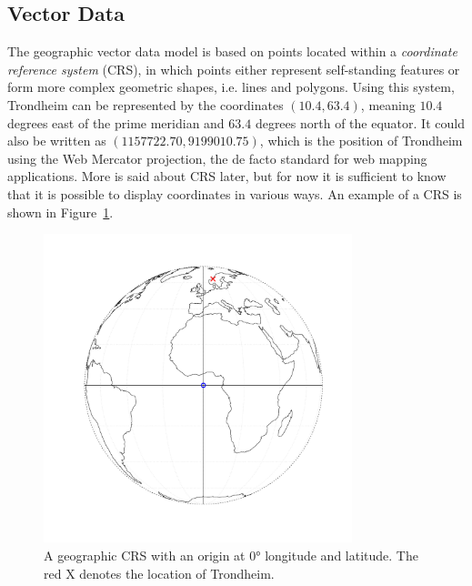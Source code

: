 \subsection{Vector Data}
The geographic vector data model is based on points located within a \textit{coordinate reference system} (CRS), in which points either represent self-standing features or form more complex geometric shapes, i.e. lines and polygons. Using this system, Trondheim can be represented by the coordinates $\left(10.4, 63.4\right)$, meaning $10.4$ degrees east of the prime meridian and $63.4$ degrees north of the equator. It could also be written as $\left(1157722.70, 9199010.75\right)$, which is the position of Trondheim using the Web Mercator projection, the de facto standard for web mapping applications. More is said about CRS later, but for now it is sufficient to know that it is possible to display coordinates in various ways. An example of a CRS is shown in Figure~\ref{fig:globe}.
\begin{figure}[H]
   \centering
       \includegraphics[page=1,width=0.8\textwidth]{globe.pdf}
 \caption{A geographic CRS with an origin at 0° longitude and latitude. The red X denotes the location of Trondheim.}
 \label{fig:globe}
\end{figure}
